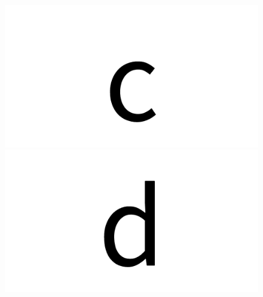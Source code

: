\documentclass{article}
\begin{document}
\begin{figure}[H]
  \includegraphics[width=\linewidth]{c}
\endminipage\hfill
{}
  \includegraphics[width=\linewidth]{d}
\endminipage\hfill
\end{figure}
\end{document}
